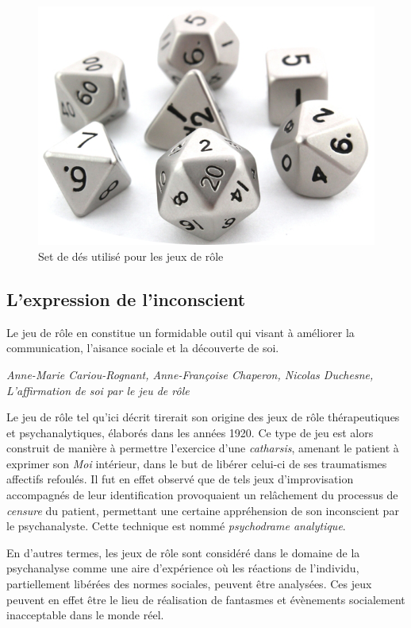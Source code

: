 \begin{figure}[h!]
    \centering
    \includegraphics[width=0.80\linewidth]{img/dice_set.png}
    \caption{Set de dés utilisé pour les jeux de rôle}
\end{figure}

\clearpage


\subsection{L'expression de l'inconscient}

\begin{shadequote}
Le jeu de rôle en constitue un formidable outil qui visant à améliorer la communication, l'aisance sociale et la découverte de soi.
\par\emph{Anne-Marie Cariou-Rognant, Anne-Françoise Chaperon, Nicolas Duchesne, L'affirmation de soi par le jeu de rôle}
\end{shadequote}

Le jeu de rôle tel qu'ici décrit tirerait son origine des jeux de rôle thérapeutiques et psychanalytiques, élaborés dans les années 1920. Ce type de jeu est alors construit de manière à permettre l'exercice d'une \textit{catharsis}, amenant le patient à exprimer son \textit{Moi} intérieur, dans le but de libérer celui-ci de ses traumatismes affectifs refoulés. Il fut en effet observé que de tels jeux d'improvisation accompagnés de leur identification provoquaient un relâchement du processus de \textit{censure} du patient, permettant une certaine appréhension de son inconscient par le psychanalyste. Cette technique est nommé \textit{psychodrame analytique}.

En d'autres termes, les jeux de rôle sont considéré dans le domaine de la psychanalyse comme une aire d'expérience où les réactions de l'individu, partiellement libérées des normes sociales, peuvent être analysées. Ces jeux peuvent en effet être le lieu de réalisation de fantasmes et évènements socialement inacceptable dans le monde réel.\\


